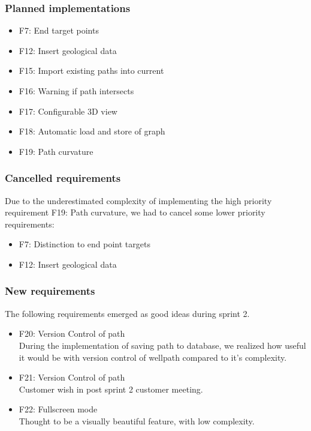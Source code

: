 \documentclass{report}
\begin{document}
\subsubsection{Planned implementations}

\begin{itemize}
    \item F7: End target points
    \item F12: Insert geological data
    \item F15: Import existing paths into current
    \item F16: Warning if path intersects
    \item F17: Configurable 3D view
    \item F18: Automatic load and store of graph
    \item F19: Path curvature
\end{itemize}

\subsubsection{Cancelled requirements}
Due to the underestimated complexity of implementing the high priority requirement F19: Path curvature, we had to cancel some lower priority requirements:
\begin{itemize}
    \item F7: Distinction to end point targets
    \item F12: Insert geological data
\end{itemize}

\subsubsection{New requirements}
The following requirements emerged as good ideas during sprint 2.
\begin{itemize}
    \item F20: Version Control of path \\
    During the implementation of saving path to database, we realized how useful it would be with version control of wellpath compared to it's complexity.
    \item F21: Version Control of path \\
    Customer wish in post sprint 2 customer meeting.
    \item F22: Fullscreen mode \\
    Thought to be a visually beautiful feature, with low complexity.
    
\end{itemize}
\end{document}
